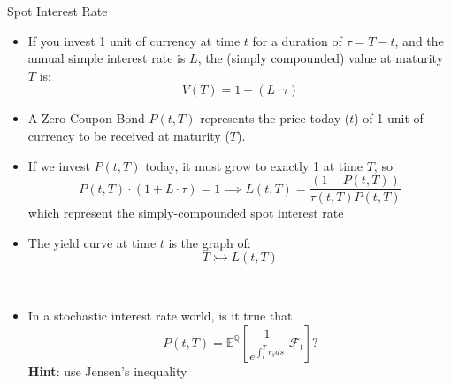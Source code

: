 \documentclass{beamer}
\begin{document}
\begin{frame}{Spot Interest Rate}
	\begin{itemize}
		\item  If you invest 1 unit of currency at time $t$ for a duration of $\tau = T-t$, and the annual simple interest rate is $L$, the (simply compounded) value at maturity $T$ is:
		\begin{equation*}
		V(T)=1+(L\cdot \tau)
		\end{equation*}
		\item A Zero-Coupon Bond $P(t,T)$ represents the price today ($t$) of 1 unit of currency to be received at maturity ($T$).
		\item If we invest $P(t,T)$ today, it must grow to exactly 1 at time $T$, so
		\begin{equation}
		P(t,T)\cdot (1+L\cdot\tau)=1 \implies L(t,T)=\frac{(1-P(t,T))}{\tau(t,T)P(t,T)}
		\end{equation}
		which represent the simply-compounded \textcolor{maincolor}{spot interest rate}
		\item The \textcolor{maincolor}{yield curve} at time $t$ is the graph of:
		\begin{equation*}
			T\rightarrowtail L(t, T)
		\end{equation*}
	\end{itemize}
\end{frame}

\begin{homework}
	\begin{frame}{\textcolor{white}{The Expectation Paradox}}
		\begin{itemize}
			\item[white] In a stochastic interest rate world, is it true that
			\begin{equation*}
				P(t,T)=\mathbb{E}^{\mathbb{Q}}\left[ \frac{1}{e^{\int_t^T r_s ds}} |\mathcal{F}_t \right] ?
			\end{equation*}
			\textbf{Hint}: use Jensen's inequality
		\end{itemize}
	\end{frame}
\end{homework}
\end{document}
